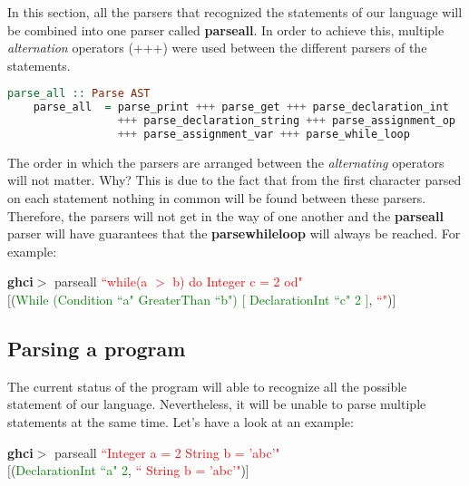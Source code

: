 \documentclass[a4paper, onecolumn]{article}
\begin{document}
    In this section, all the parsers that recognized the statements of our language will be combined into one parser called \textbf{parse\textunderscore all}. In order to achieve this, multiple \textit{alternation} operators (+++) were used between the different parsers of the statements.
    
    \begin{tcolorbox}
    \begin{lstlisting}[language=Haskell] 
    parse_all :: Parse AST
    parse_all  = parse_print +++ parse_get +++ parse_declaration_int 
                 +++ parse_declaration_string +++ parse_assignment_op 
                 +++ parse_assignment_var +++ parse_while_loop
    \end{lstlisting}
    \end{tcolorbox}
    
    \noindent The order in which the parsers are arranged between the \textit{alternating} operators will not matter. Why? This is due to the fact that from the first character parsed on each statement nothing in common will be found between these parsers. Therefore, the parsers will not get in the way of one another and the \textbf{parse\textunderscore all} parser will have guarantees that the \textbf{parse\textunderscore while\textunderscore loop} will always be reached. For example:
    
    \begin{center}
            \textbf{ghci$>$} parse\textunderscore all \textcolor{red}{``while(a $>$ b) do Integer c = 2 od"} \\
             $\big[$(\textcolor{green}{While (Condition ``a" GreaterThan ``b") $\big[$ DeclarationInt ``c" 2 $\big]$}, \textcolor{red}{``"})$\big]$
        \end{center}
    
    
    \subsection{Parsing a program}
    
    The current status of the program will able to recognize all the possible statement of our language. Nevertheless, it will be unable to parse multiple statements at the same time. Let's have a look at an example: 
    
    \begin{center}
            \textbf{ghci$>$} parse\textunderscore all \textcolor{red}{``Integer a = 2 String b = 'abc'"} \\
             $\big[$(\textcolor{green}{DeclarationInt ``a" 2}, \textcolor{red}{`` String b = 'abc'"})$\big]$
        \end{center}
        
\end{document}
